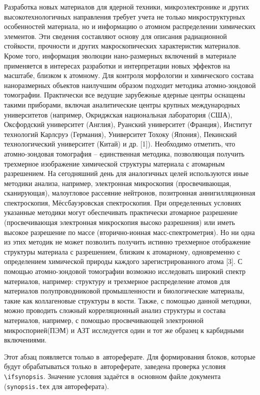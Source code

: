 
{\actuality} Разработка новых материалов для ядерной техники, микроэлектронике и других высокотехнологичных направления требует учета не только микроструктурных особенностей материала, но и информацию о атомном распределении химических элементов. Эти сведения составляют основу для описания радиационной стойкости, прочности и других макроскопических характеристик материалов. Кроме того, информация эволюции нано-размерных включений в материале применяется в интересах разработки и интерпретации новых эффектов на масштабе, близком к атомному.
Для контроля морфологии и химического состава наноразмерных объектов наилучшим образом подходит методика атомно-зондовой томографии. Практически все ведущие зарубежные ядерные центры оснащены такими приборами, включая аналитические центры крупных международных университетов (например, Окриджская национальная лаборатория (США), Оксфордский университет (Англия), Руанский университет (Франция), Институт технологий Карлсруэ (Германия), Университет Тохоку (Япония), Пекинский технологический университет (Китай) и др. [1]). Необходимо отметить, что атомно-зондовая томография – единственная методика, позволяющая получить трехмерное изображение химической структуры материала с атомарным разрешением. На сегодняшний день для аналогичных целей используются иные методики анализа, например, электронная микроскопия (просвечивающая, сканирующая), малоугловое рассеяние нейтронов, позитронная аннигилляционная спектроскопия, Мёссбауэровская спектроскопия. При определенных условиях указанные методики могут обеспечивать практически атомарное разрешение (просвечивающая электронная микроскопия высоко разрешения) или иметь высокое разрешение по массе (вторично-ионная масс-спектрометрия). Но ни одна из этих методик не может позволить получить истинно трехмерное отображение структуры материала с разрешением, близким к атомарному, одновременно с определением химической природы каждого зарегистрированного атома [3]. С помощью атомно-зондовой томографии возможно исследовать широкий спектр материалов, например: структуру и трехмерное распределение атомов для материалов полупроводниковой промышленности\cite{Ulfig23} и биологические материалы, такие как коллагеновые структуры в кости\cite{Lee21}. Также, с помощью данной методики, можно проводить сложный корреляционный анализ структуры и состава материалов, например, с помощью просвечивающей электронной микроспорией(ПЭМ) и АЗТ исследуется один и тот же образец к карбидными включениями\cite{Liebscher18}.


\ifsynopsis
Этот абзац появляется только в~автореферате.
Для формирования блоков, которые будут обрабатываться только в~автореферате,
заведена проверка условия \verb!\!\verb!ifsynopsis!.
Значение условия задаётся в~основном файле документа (\verb!synopsis.tex! для
автореферата).
\else
\fi

